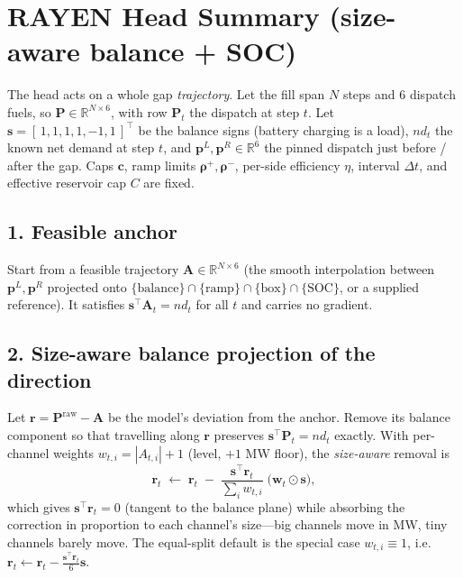 \documentclass{article}
\begin{document}
\section*{RAYEN Head Summary (size-aware balance + SOC)}

The head acts on a whole gap \emph{trajectory}. Let the fill span $N$ steps and
$6$ dispatch fuels, so $\mathbf{P}\in\mathbb{R}^{N\times 6}$, with row $\mathbf{P}_t$
the dispatch at step $t$. Let $\mathbf{s}=[\,1,1,1,1,-1,1\,]^\top$ be the balance
signs (battery charging is a load), $nd_t$ the known net demand at step $t$, and
$\mathbf{p}^L,\mathbf{p}^R\in\mathbb{R}^6$ the pinned dispatch just before / after
the gap. Caps $\mathbf{c}$, ramp limits $\bm{\rho}^+,\bm{\rho}^-$, per-side
efficiency $\eta$, interval $\Delta t$, and effective reservoir cap $C$ are fixed.

\subsection*{1. Feasible anchor}
Start from a feasible trajectory $\mathbf{A}\in\mathbb{R}^{N\times 6}$ (the smooth
interpolation between $\mathbf{p}^L,\mathbf{p}^R$ projected onto
$\{\text{balance}\}\cap\{\text{ramp}\}\cap\{\text{box}\}\cap\{\text{SOC}\}$, or a
supplied reference). It satisfies $\mathbf{s}^\top\mathbf{A}_t=nd_t$ for all $t$ and
carries no gradient.

\subsection*{2. Size-aware balance projection of the direction}
Let $\mathbf{r}=\mathbf{P}^{\text{raw}}-\mathbf{A}$ be the model's deviation from the
anchor. Remove its balance component so that travelling along $\mathbf{r}$ preserves
$\mathbf{s}^\top\mathbf{P}_t=nd_t$ exactly. With per-channel weights
$w_{t,i}=|A_{t,i}|+1$ (level, $+1$ MW floor), the \emph{size-aware} removal is
\begin{equation}
    \mathbf{r}_{t} \;\leftarrow\; \mathbf{r}_{t}
    \;-\; \frac{\mathbf{s}^\top \mathbf{r}_{t}}{\sum_{i} w_{t,i}}\;\bigl(\mathbf{w}_{t}\odot \mathbf{s}\bigr),
\end{equation}
which gives $\mathbf{s}^\top \mathbf{r}_{t}=0$ (tangent to the balance plane) while
absorbing the correction in proportion to each channel's size---big channels move
in MW, tiny channels barely move. The equal-split default is the special case
$w_{t,i}\equiv 1$, i.e. $\mathbf{r}_t\leftarrow \mathbf{r}_t-\tfrac{\mathbf{s}^\top\mathbf{r}_t}{6}\mathbf{s}$.
\end{document}
